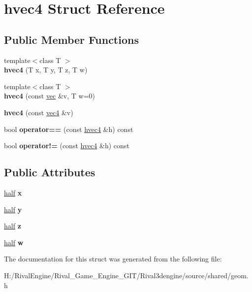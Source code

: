 \hypertarget{structhvec4}{}\section{hvec4 Struct Reference}
\label{structhvec4}
\subsection*{Public Member Functions}
\begin{DoxyCompactItemize}
\item 
\mbox{\label{structhvec4_a651c521f28594966b1480cd2f8989932}} 
{\footnotesize template$<$class T $>$ }\\{\bfseries hvec4} (T x, T y, T z, T w)
\item 
\mbox{\label{structhvec4_abea40299a905d039dd2ab4a1c01e6eed}} 
{\footnotesize template$<$class T $>$ }\\{\bfseries hvec4} (const \hyperlink{structvec}{vec} \&v, T w=0)
\item 
\mbox{\label{structhvec4_a501c10fb8668699de9d01b860c89f969}} 
{\bfseries hvec4} (const \hyperlink{structvec4}{vec4} \&v)
\item 
\mbox{\label{structhvec4_a3b786e194c39501364ab3b797ace36e6}} 
bool {\bfseries operator==} (const \hyperlink{structhvec4}{hvec4} \&h) const
\item 
\mbox{\label{structhvec4_a6cdea4e790c60b1e7b816307ba6edb1a}} 
bool {\bfseries operator!=} (const \hyperlink{structhvec4}{hvec4} \&h) const
\end{DoxyCompactItemize}
\subsection*{Public Attributes}
\begin{DoxyCompactItemize}
\item 
\mbox{\label{structhvec4_a556817483babaaa77d112337b17ec1d8}} 
\hyperlink{structhalf}{half} {\bfseries x}
\item 
\mbox{\label{structhvec4_a5450248ae2dcd735d11f3d03a1ff0d3a}} 
\hyperlink{structhalf}{half} {\bfseries y}
\item 
\mbox{\label{structhvec4_aea76478717c70b2afb21dbd30b52d336}} 
\hyperlink{structhalf}{half} {\bfseries z}
\item 
\mbox{\label{structhvec4_a7e7f44da8606820ebbceb96791689d80}} 
\hyperlink{structhalf}{half} {\bfseries w}
\end{DoxyCompactItemize}


The documentation for this struct was generated from the following file\+:\begin{DoxyCompactItemize}
\item 
H\+:/\+Rival\+Engine/\+Rival\+\_\+\+Game\+\_\+\+Engine\+\_\+\+G\+I\+T/\+Rival3dengine/source/shared/geom.\+h\end{DoxyCompactItemize}
